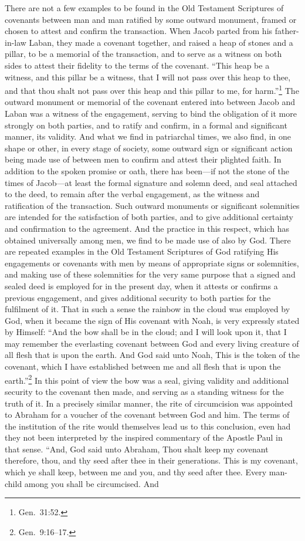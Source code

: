 \documentclass[
]{book}
\begin{document}
There are not a few examples to be found in the Old Testament Scriptures of covenants between man and man ratified by some outward monument, framed or chosen to attest and confirm the transaction. When Jacob parted from his father-in-law Laban, they made a covenant together, and raised a heap of stones and a pillar, to be a memorial of the transaction, and to serve as a witness on both sides to attest their fidelity to the terms of the covenant. ``This heap be a witness, and this pillar be a witness, that I will not pass over this heap to thee, and that thou shalt not pass over this heap and this pillar to me, for harm.''\footnote{Gen.~31:52.} The outward monument or memorial of the covenant entered into between Jacob and Laban was a witness of the engagement, serving to bind the obligation of it more strongly on both parties, and to ratify and confirm, in a formal and significant manner, its validity. And what we find in patriarchal times, we also find, in one shape or other, in every stage of society, some outward sign or significant action being made use of between men to confirm and attest their plighted faith. In addition to the spoken promise or oath, there has been---if not the stone of the times of Jacob---at least the formal signature and solemn deed, and seal attached to the deed, to remain after the verbal engagement, as the witness and ratification of the transaction. Such outward monuments or significant solemnities are intended for the satisfaction of both parties, and to give additional certainty and confirmation to the agreement. And the practice in this respect, which has obtained universally among men, we find to be made use of also by God. There are repeated examples in the Old Testament Scriptures of God ratifying His engagements or covenants with men by means of appropriate signs or solemnities, and making use of these solemnities for the very same purpose that a signed and sealed deed is employed for in the present day, when it attests or confirms a previous engagement, and gives additional security to both parties for the fulfilment of it. That in such a sense the rainbow in the cloud was employed by God, when it became the sign of His covenant with Noah, is very expressly stated by Himself: ``And the bow shall be in the cloud; and I will look upon it, that I may remember the everlasting covenant between God and every living creature of all flesh that is upon the earth. And God said unto Noah, This is the token of the covenant, which I have established between me and all flesh that is upon the earth.''\footnote{Gen.~9:16--17.} In this point of view the bow was a seal, giving validity and additional security to the covenant then made, and serving as a standing witness for the truth of it. In a precisely similar manner, the rite of circumcision was appointed to Abraham for a voucher of the covenant between God and him. The terms of the institution of the rite would themselves lead us to this conclusion, even had they not been interpreted by the inspired commentary of the Apostle Paul in that sense. ``And, God said unto Abraham, Thou shalt keep my covenant therefore, thou, and thy seed after thee in their generations. This is my covenant, which ye shall keep, between me and you, and thy seed after thee. Every man-child among you shall be circumcised. And 
\end{document}
